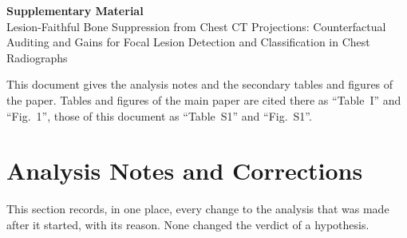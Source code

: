 \documentclass[journal]{IEEEtran}
\begin{document}
\begin{center}
{\Large\bfseries Supplementary Material}\\[0.5em]
{\large Lesion-Faithful Bone Suppression from Chest CT Projections: Counterfactual Auditing and Gains for Focal Lesion Detection and
Classification in Chest Radiographs}
\end{center}
\medskip

This document gives the analysis notes and the secondary tables and figures of the paper. Tables and figures of the main paper are cited
there as ``Table~I'' and ``Fig.~1'', those of this document as ``Table~S1'' and ``Fig.~S1''.

\section{Analysis Notes and Corrections}
\label{sup:notes}
This section records, in one place, every change to the analysis that was made after it started, with its reason. None changed the
verdict of a hypothesis.
\end{document}
